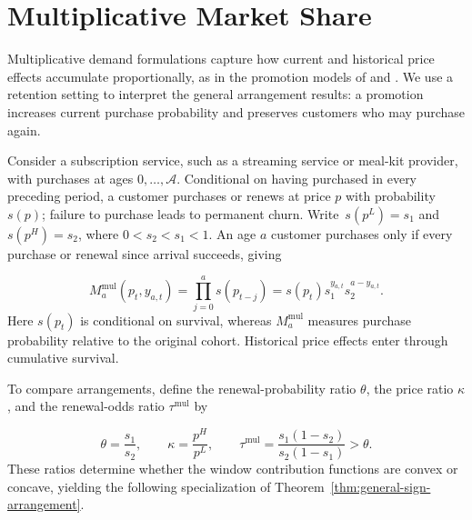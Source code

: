 \begingroup\color{black}
\section{Multiplicative Market Share}
\label{sec:beyond-linear}

\begingroup\color{black}
Multiplicative demand formulations capture how current and historical price effects accumulate proportionally, as in the promotion models of \citet{vanheerde2000dips} and \citet{cohen2017promotion}. We use a retention setting to interpret the general arrangement results: a promotion increases current purchase probability and preserves customers who may purchase again.
\par\endgroup

\begingroup\color{black}
Consider a subscription service, such as a streaming service or meal-kit provider, with purchases at ages \(0,\ldots,\mathcal A\). Conditional on having purchased in every preceding period, a customer purchases or renews at price \(p\) with probability \(s(p)\); failure to purchase leads to permanent churn. Write~\(s(p^L)=s_1\) and \(s(p^H)=s_2\), where \(0<s_2<s_1<1\). An age \(a\) customer purchases only if every purchase or renewal since arrival succeeds, giving
\par\endgroup
\nopagebreak[4]
\[
 M_a^{\mathrm{mul}}(p_t,y_{a,t})
 =\prod_{j=0}^{a}s(p_{t-j})
 =s(p_t)s_1^{y_{a,t}}s_2^{a-y_{a,t}}.
\]
\begingroup\color{black}
Here \(s(p_t)\) is conditional on survival, whereas \(M_a^{\mathrm{mul}}\) measures purchase probability relative to the original cohort. Historical price effects enter through cumulative survival.
\par\endgroup

\begingroup\color{black}
To compare arrangements, define the renewal-probability ratio \(\theta\), the price ratio \(\kappa\), and the renewal-odds ratio \(\tau^{\mathrm{mul}}\) by
\par\endgroup
\[
 \theta=\frac{s_1}{s_2},
 \qquad \kappa=\frac{p^H}{p^L},
 \qquad \tau^{\mathrm{mul}}
 =\frac{s_1(1-s_2)}{s_2(1-s_1)}
 >\theta.
\]
These ratios determine whether the window contribution functions are convex or concave, yielding the following specialization of Theorem~\ref{thm:general-sign-arrangement}.

